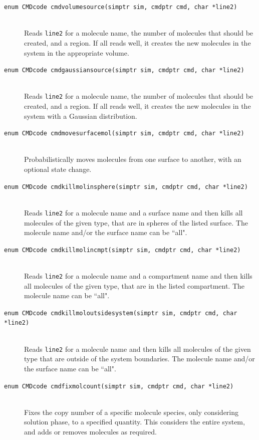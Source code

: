 \documentclass {scrbook}
\newcommand {\ttt} {\texttt}
\begin{document}
\begin{description}
\item[\ttt{enum CMDcode cmdvolumesource(simptr sim, cmdptr cmd, char *line2)}]
\hfill \\
Reads \ttt{line2} for a molecule name, the number of molecules that should be created, and a region. If all reads well, it creates the new molecules in the system in the appropriate volume.

\item[\ttt{enum CMDcode cmdgaussiansource(simptr sim, cmdptr cmd, char *line2)}]
\hfill \\
Reads \ttt{line2} for a molecule name, the number of molecules that should be created, and a region. If all reads well, it creates the new molecules in the system with a Gaussian distribution.

\item[\ttt{enum CMDcode cmdmovesurfacemol(simptr sim, cmdptr cmd, char *line2)}]
\hfill \\
Probabilistically moves molecules from one surface to another, with an optional state change.

\item[\ttt{enum CMDcode cmdkillmolinsphere(simptr sim, cmdptr cmd, char *line2)}]
\hfill \\
Reads \ttt{line2} for a molecule name and a surface name and then kills all molecules of the given type, that are in spheres of the listed surface. The molecule name and/or the surface name can be ``all".

\item[\ttt{enum CMDcode cmdkillmolincmpt(simptr sim, cmdptr cmd, char *line2)}]
\hfill \\
Reads \ttt{line2} for a molecule name and a compartment name and then kills all molecules of the given type, that are in the listed compartment. The molecule name can be ``all".

\item[\ttt{enum CMDcode cmdkillmoloutsidesystem(simptr sim, cmdptr cmd, char *line2)}]
\hfill \\
Reads \ttt{line2} for a molecule name and then kills all molecules of the given type that are outside of the system boundaries. The molecule name and/or the surface name can be ``all".

\item[\ttt{enum CMDcode cmdfixmolcount(simptr sim, cmdptr cmd, char *line2)}]
\hfill \\
Fixes the copy number of a specific molecule species, only considering solution phase, to a specified quantity. This considers the entire system, and adds or removes molecules as required.


\end{description}
\end{document}
